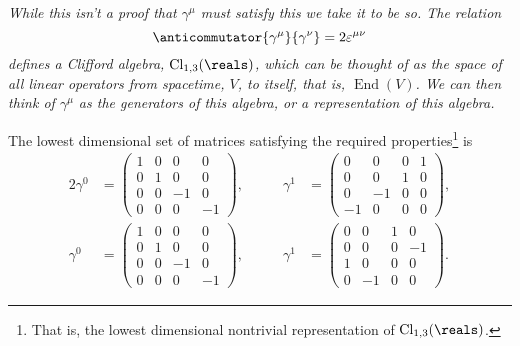 \documentclass[fleqn]{NotesClass}
\begin{document}
    \itshape
    While this isn't a proof that \(\gamma^\mu\) must satisfy this we take it to be so.
    The relation
    \begin{equation}
        \anticommutator{\gamma^\mu}{\gamma^\nu} = 2\varepsilon^{\mu\nu}
    \end{equation}
    defines a Clifford algebra, \(\operatorname{Cl}_{1,3}(\reals)\), which can be thought of as the space of all linear operators from spacetime, \(V\), to itself, that is, \(\operatorname{End}(V)\).
    We can then think of \(\gamma^\mu\) as the generators of this algebra, or a representation of this algebra.
    \normalshape
    
    The lowest dimensional set of matrices satisfying the required properties\footnote{That is, the lowest dimensional nontrivial representation of \(\operatorname{Cl}_{1,3}(\reals)\).} is
    \begin{alignat}{2}
        \gamma^0 &= 
        \begin{pmatrix}
            1 & 0 & 0 & 0 \\
            0 & 1 & 0 & 0 \\
            0 & 0 & -1 & 0 \\
            0 & 0 & 0 & -1
        \end{pmatrix}
        , \qquad & \gamma^1 &= 
        \begin{pmatrix}
            0 & 0 & 0 & 1 \\
            0 & 0 & 1 & 0 \\
            0 & -1 & 0 & 0\\
            -1 & 0 & 0 & 0
        \end{pmatrix}
        ,\\
        \gamma^0 &= 
        \begin{pmatrix}
            1 & 0 & 0 & 0 \\
            0 & 1 & 0 & 0 \\
            0 & 0 & -1 & 0 \\
            0 & 0 & 0 & -1
        \end{pmatrix}
        , \qquad & \gamma^1 &= 
        \begin{pmatrix}
            0 & 0 & 1 & 0 \\
            0 & 0 & 0 & -1 \\
            1 & 0 & 0 & 0\\
            0 & -1 & 0 & 0
        \end{pmatrix}
        .
    \end{alignat}
\end{document}

